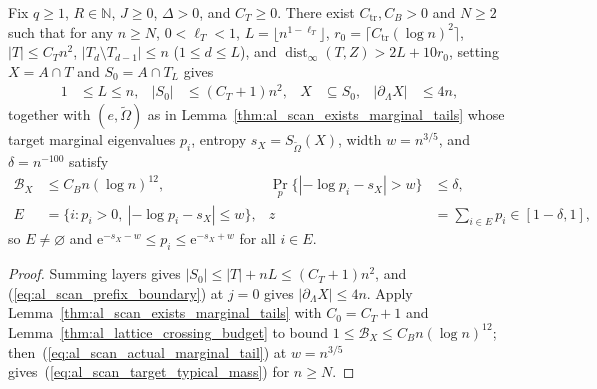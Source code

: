 \begin{lemma}
    \label{thm:al_scan_target_typical_window}
    \leanok
    Fix $q\ge1$, $R\in\mathbb N$, $J\ge0$, $\Delta>0$, and $C_T\ge0$. There
    exist $C_{\mathrm{tr}},C_B>0$ and $N\ge2$ such that for any $n\ge N$,
    $0<\ell_T<1$, $L=\lfloor n^{1-\ell_T}\rfloor$,
    $r_0=\lceil C_{\mathrm{tr}}(\log n)^2\rceil$, $|T|\le C_Tn^2$,
    $|T_d\setminus T_{d-1}|\le n$ ($1\le d\le L$), and
    $\operatorname{dist}_\infty(T,Z)>2L+10r_0$, setting $X=A\cap T$ and
    $S_0=A\cap T_L$ gives
    \begin{align}
        1 & \le L\le n,    & |S_0|                & \le(C_T+1)n^2, &
        X & \subseteq S_0, & |\partial_\Lambda X| & \le4n,
        \label{eq:al_scan_target_geometry}
    \end{align}
    together with $(e,\widetilde\Omega)$ as in
    Lemma~\ref{thm:al_scan_exists_marginal_tails} whose target marginal
    eigenvalues $p_i$, entropy $s_X=S_{\widetilde\Omega}(X)$, width $w=n^{3/5}$,
    and $\delta=n^{-100}$ satisfy
    \begin{align}
        \mathcal B_X                 & \le C_Bn(\log n)^{12},                 &
        \Pr_p\{|{-\log p_i}-s_X|>w\} & \le\delta,                               \\
        E                            & =\{i:p_i>0,\ |{-\log p_i}-s_X|\le w\}, &
        z                            & =\sum_{i\in E}p_i\in[1-\delta,1],
        \label{eq:al_scan_target_typical_mass}
    \end{align}
    so $E\ne\varnothing$ and $\mathrm e^{-s_X-w}\le p_i\le\mathrm e^{-s_X+w}$
    for all $i\in E$.
\end{lemma}
\begin{proof}\leanok
    Summing layers gives $|S_0|\le|T|+nL\le(C_T+1)n^2$, and
    (\ref{eq:al_scan_prefix_boundary}) at $j=0$ gives $|\partial_\Lambda X|\le4n$.
    Apply Lemma~\ref{thm:al_scan_exists_marginal_tails} with $C_0=C_T+1$ and
    Lemma~\ref{thm:al_lattice_crossing_budget} to bound
    $1\le\mathcal B_X\le C_Bn(\log n)^{12}$; then~(\ref{eq:al_scan_actual_marginal_tail})
    at $w=n^{3/5}$ gives~(\ref{eq:al_scan_target_typical_mass}) for $n\ge N$.
\end{proof}

